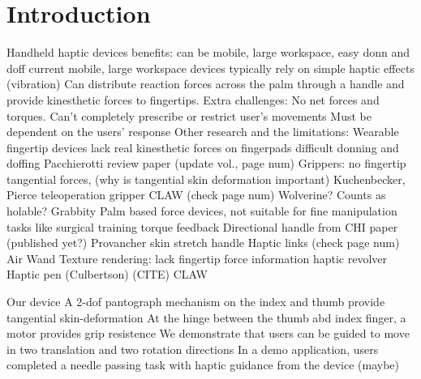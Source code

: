 \section{Introduction}

\begin{outline}
    \1 Handheld haptic devices
        \2 benefits: can be mobile, large workspace, easy donn and doff
        \2 current mobile, large workspace devices typically rely on simple haptic effects (vibration)
        \2 Can distribute reaction forces across the palm through a handle and provide kinesthetic forces to fingertips. 
    \1 Extra challenges:
        \2 No net forces and torques.
        \2 Can't completely prescribe or restrict user's movements 
        \2 Must be dependent on the users' response
    \1 Other research and the limitations:
        \2 Wearable fingertip devices 
            \3 lack real kinesthetic forces on fingerpads
            \3 difficult donning and doffing 
            \3 Pacchierotti review paper\cite{Pacchierotti2017} (update vol., page num)
        \2 Grippers: no fingertip tangential forces, (why is tangential skin deformation important)
            \3 Kuchenbecker, Pierce teleoperation gripper \cite{Pierce2014}
            \3 CLAW \cite{Choi2018} (check page num)
            \3 Wolverine? Counts as holable?
            \3 Grabbity \cite{Choi2017}
        \2 Palm based force devices, not suitable for fine manipulation tasks like surgical training
            \3 \cite{Walker2017, Yano2003}torque feedback 
            \3 Directional handle from CHI paper (published yet?)
            \3 Provancher skin stretch handle \cite{Gleeson2009}
            \3 Haptic links \cite{Strasnick2018} (check page num)
            \3 Air Wand \cite{Romano2009}
        \2 Texture rendering: lack fingertip force information
            \3 haptic revolver \cite{Whitmire2018}
            \3 Haptic pen (Culbertson) (CITE)
            \3 CLAW

    \1 Our device 
        \2 A 2-dof pantograph mechanism on the index and thumb provide tangential skin-deformation 
        \2 At the hinge between the thumb abd index finger, a motor provides grip resistence 
        \2 We demonstrate that users can be guided to move in two translation and two rotation directions
        \2 In a demo application, users completed a needle passing task with haptic guidance from the device (maybe)

\end{outline}


